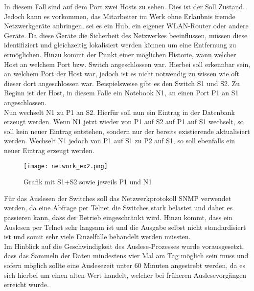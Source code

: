 In diesem Fall sind auf dem Port zwei Hosts zu sehen.
Dies ist der Soll Zustand. Jedoch kann es vorkommen, das Mitarbeiter im Werk ohne Erlaubnis fremde Netzwerkgeräte anbringen, sei es ein Hub, ein eigener WLAN-Router oder andere Geräte. Da diese Geräte die Sicherheit des Netzwerkes beeinflussen, müssen diese identifiziert und gleichzeitig lokalisiert werden können um eine Entfernung zu ermöglichen.
Hinzu kommt der Punkt einer möglichen Historie, wann welcher Host an welchem Port bzw. Switch angeschlossen war. Hierbei soll erkennbar sein, an welchem Port der Host war, jedoch ist es nicht notwendig zu wissen wie oft dieser dort angeschlossen war. Beispielsweise gibt es den Switch S1 und S2. Zu Beginn ist der Host, in diesem Falle ein Notebook N1, an einen Port P1 an S1 angeschlossen.\\
Nun wechselt N1 zu P1 an S2.
Hierfür soll nun ein Eintrag in der Datenbank erzeugt werden. Wenn N1 jetzt wieder von P1 auf S2 auf P1 auf S1 wechselt, so soll kein neuer Eintrag entstehen, sondern nur der bereits existierende aktualisiert werden. Wechselt N1 jedoch von P1 auf S1 zu P2 auf S1, so soll ebenfalls ein neuer Eintrag erzeugt werden.\\

\begin{figure}[H]
\centering
\texttt{[image: network\_ex2.png]}
\caption{Grafik mit S1+S2 sowie jeweils P1 und N1}
\label{fig:show_s1_s2_p1_n1}
\end{figure}


Für das Auslesen der Switches soll das Netzwerkprotokoll SNMP verwendet werden, da eine Abfrage per Telnet die Switches stark belastet und daher es passieren kann, dass der Betrieb eingeschränkt wird. Hinzu kommt, dass ein Auslesen per Telnet sehr langsam ist und die Ausgabe selbst nicht standardisiert ist und somit sehr viele Einzelfälle behandelt werden müssten.\\
Im Hinblick auf die Geschwindigkeit des Auslese-Prozesses wurde vorausgesetzt, dass das Sammeln der Daten mindestens vier Mal am Tag möglich sein muss und sofern möglich sollte eine Auslesezeit unter 60 Minuten angestrebt werden, da es sich hierbei um einen alten Wert handelt, welcher bei früheren Auslesevorgängen erreicht wurde.\\

